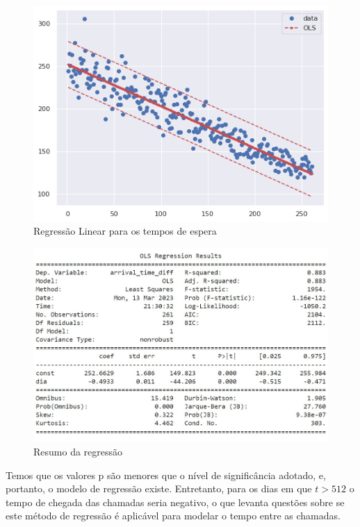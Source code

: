 \begin{figure}[H]
    \includegraphics[scale=0.9]{analise-de-dados/regressao/regressao_OLS.png}
    \caption{Regressão Linear para os tempos de espera}
    \label{fig: plot_OLS}
\end{figure}

\begin{figure}[H]
    \includegraphics[scale = 0.85]{analise-de-dados/regressao/OLS_summary.jpg}
    \caption{Resumo da regressão}
    \label{fig: sum_OLS}
\end{figure}

Temos que os valores p são menores que o nível de significância adotado, e, portanto, o modelo de regressão existe. Entretanto, para os dias em que $t > 512$ o tempo de chegada das chamadas seria negativo, o que levanta questões sobre se este método de regressão é aplicável para modelar o tempo entre as chamadas.

